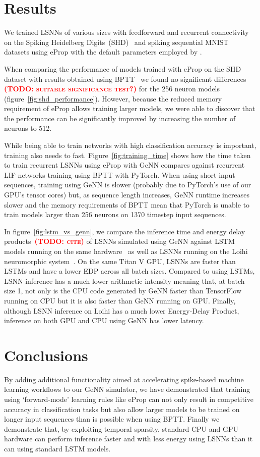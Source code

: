 \documentclass[sigconf,authordraft]{acmart}
\newcommand{\todo}[1]{\textbf{\textsc{\textcolor{red}{(TODO: #1)}}}}
\begin{document}
\section{Results}
We trained LSNNs of various sizes with feedforward and recurrent connectivity on the Spiking Heidelberg Digits~(SHD)~\citep{Cramer2020} and spiking sequential MNIST~\citep{Plank2021} datasets using eProp with the default parameters employed by \citet{Bellec2020}.

When comparing the performance of models trained with eProp on the SHD dataset with results obtained using BPTT~\citep{Zenke2021a} we found no significant differences \todo{suitable significance test?} for the \num{256} neuron models (figure~\ref{fig:shd_performance}). 
However, because the reduced memory requirement of eProp allows training larger models, we were  able to discover that the performance can be significantly improved by increasing the number of neurons to \num{512}.

While being able to train networks with high classification accuracy is important, training also needs to fast.
Figure~\ref{fig:training_time} shows how the time taken to train recurrent LSNNs using eProp with GeNN compares against recurrent LIF networks training using BPTT with PyTorch.
When using short input sequences, training using GeNN is slower (probably due to PyTorch's use of our GPU's tensor cores) but, as sequence length increases, GeNN runtime increases slower and the memory requirements of BPTT mean that PyTorch is unable to train models larger than \num{256} neurons on \num{1370} timestep input sequences.

In figure~\ref{fig:lstm_vs_genn}, we compare the inference time and energy delay products~\todo{cite} of LSNNs simulated using GeNN against LSTM models running on the same hardware~\citep{Plank2021} as well as LSNNs running on the Loihi neuromorphic system~\citep{Davies2018}.
On the same Titan V GPU, LSNNs are faster than LSTMs and have a lower EDP across all batch sizes.
Compared to using LSTMs, LSNN inference has a much lower arithmetic intensity meaning that, at batch size 1, not only is the CPU code generated by GeNN faster than TensorFlow running on CPU but it is also faster than GeNN running on GPU.
Finally, although LSNN inference on Loihi has a much lower Energy-Delay Product, inference on both GPU and CPU using GeNN has lower latency.

\section{Conclusions}
By adding additional functionality aimed at accelerating spike-based machine learning workflows to our GeNN simulator, we have demonstrated that training using `forward-mode' learning rules like eProp can not only result in competitive accuracy in classification tasks but also allow  larger models to be trained on longer input sequences than is possible when using BPTT.
Finally we demonstrate that, by exploiting temporal sparsity, standard CPU and GPU hardware can perform inference faster and with less energy using LSNNs than it can using standard LSTM models.
\end{document}
